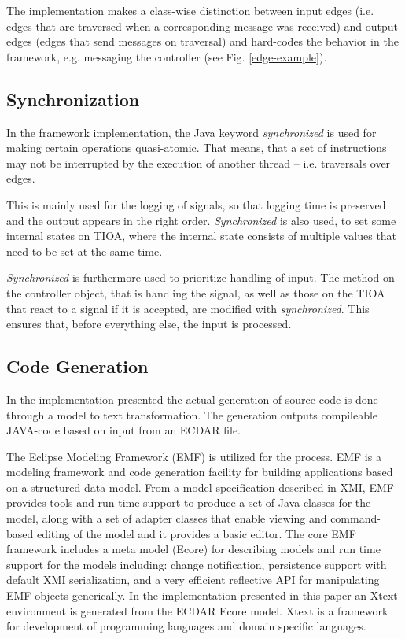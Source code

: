 The implementation makes a class-wise distinction between input edges
(i.e. edges that are traversed when a corresponding message was received) and
output edges (edges that send messages on traversal) and hard-codes the behavior
in the framework, e.g. messaging the controller (see Fig. \ref{edge-example}).


\subsection{Synchronization}
\label{subsec:synch}

In the framework implementation, the Java keyword \textit{synchronized} is 
used for making certain operations quasi-atomic. That means, that a set of
instructions may not be interrupted by the execution of another thread -- 
i.e. traversals over edges.

This is mainly used for the logging of signals, so that logging time
is preserved and the output appears in the right order. \textit{Synchronized}
is also used, to set some internal states on TIOA, where the internal state
consists of multiple values that need to be set at the same time.

\textit{Synchronized} is furthermore used to prioritize handling of input.  The
method on the controller object, that is handling the signal, as well as those
on the TIOA that react to a signal if it is accepted, are modified with
\textit{synchronized}. This ensures that, before everything else, the input is
processed.


\subsection{Code Generation}
\label{implementation-code-generation}

In the implementation presented the actual generation of source code is done
through a model to text transformation. The generation outputs compileable
JAVA-code based on input from an ECDAR file.

The Eclipse Modeling Framework (EMF) is utilized for the process. EMF is a
modeling framework and code generation facility for building applications based
on a structured data model. From a model specification described in XMI, EMF
provides tools and run time support to produce a set of Java classes for the
model, along with a set of adapter classes that enable viewing and command-based
editing of the model and it provides a basic editor.  The core EMF framework
includes a meta model (Ecore) for describing models and run time support for the
models including: change notification, persistence support with default XMI
serialization, and a very efficient reflective API for manipulating EMF objects
generically. In the implementation presented in this paper an Xtext environment
is generated from the ECDAR Ecore model. Xtext is a framework for development of
programming languages and domain specific languages.

